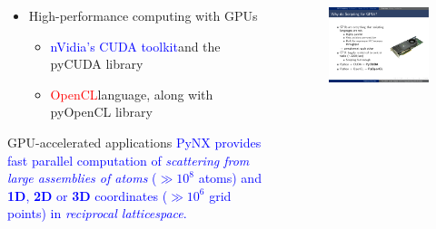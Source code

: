 \documentclass[]{beamer}
\begin{document}
\begin{frame}
\begin{columns}
    \begin{column}{.8\textwidth}
        \begin{itemize}
            \item High-performance computing with GPUs
                \begin{itemize}   
                    \item \textcolor{blue}{nVidia's CUDA toolkit}\footnotemark and the pyCUDA library
                    \item \textcolor{red}{OpenCL}\footnotemark language, along with pyOpenCL library     
                \end{itemize}  
        \end{itemize}
                \begin{block}{GPU-accelerated applications}
        \small \textcolor{blue}{PyNX provides fast parallel computation of \textit{scattering from large assemblies of atoms} ($\gg 10^{8}$ atoms) and \textbf{1D}, \textbf{2D} or \textbf{3D} coordinates ($\gg 10^{6}$ grid points) in \textit{reciprocal latticespace}.}
        \end{block}
        \vspace*{-0.31cm}
    \end{column}
    \begin{column}{.35\textwidth}
        \begin{figure}
            \begin{minipage}{0.65\textwidth}
                \includegraphics[width=\textwidth]
                {pics/tesla_card}
            \end{minipage}
        \end{figure}   
    \end{column}
    \hspace*{-1cm}
\end{columns}
\end{frame}
\end{document}

